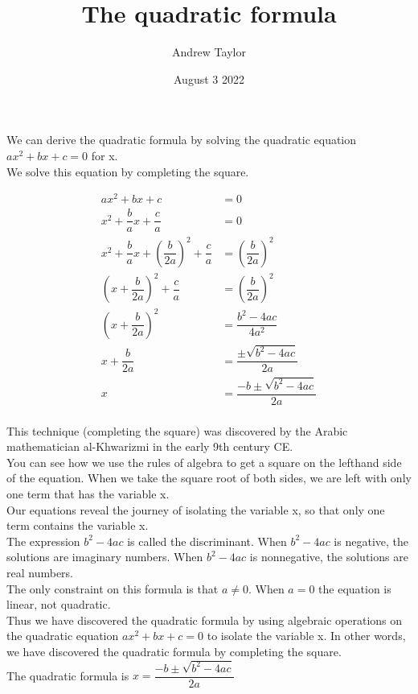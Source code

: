 \documentclass{article}
\title{The quadratic formula}
\author{Andrew Taylor}
\date{August 3 2022}
\begin{document}
\maketitle

We can derive the quadratic formula by solving the quadratic equation $ax^2 + bx + c = 0$ for x. \\

We solve this equation by completing the square.

\begin{align*}
ax^2 + bx + c &= 0 \\
x^2 + \dfrac{b}{a}x + \dfrac{c}{a} &= 0 \\
x^2 + \dfrac{b}{a}x + \left(\dfrac{b}{2a}\right)^2 + \dfrac{c}{a} &= \left(\dfrac{b}{2a}\right)^2 \\
\left(x + \dfrac{b}{2a}\right)^2 + \dfrac{c}{a} &= \left(\dfrac{b}{2a}\right)^2 \\
\left(x + \dfrac{b}{2a}\right)^2 &= \dfrac{b^2 - 4ac}{4a^2} \\
x + \dfrac{b}{2a} &= \dfrac{\pm \sqrt{b^2 - 4ac}}{2a} \\
x &= \dfrac{-b \pm \sqrt{b^2 - 4ac}}{2a} \\
\end{align*}

This technique (completing the square) was discovered by the Arabic mathematician al-Khwarizmi in the early 9th century CE. \\

You can see how we use the rules of algebra to get a square on the lefthand side of the equation. When we take the square root of both sides, we are left with only one term that has the variable x. \\

Our equations reveal the journey of isolating the variable x, so that only one term contains the variable x. \\

The expression $b^2 - 4ac$ is called the discriminant. When $b^2 - 4ac$ is negative, the solutions are imaginary numbers. When $b^2 - 4ac$ is nonnegative, the solutions are real numbers. \\

The only constraint on this formula is that $a \neq 0$. When $a = 0$ the equation is linear, not quadratic. \\

Thus we have discovered the quadratic formula by using algebraic operations on the quadratic equation $ax^2 + bx + c = 0$ to isolate the variable x. In other words, we have discovered the quadratic formula by completing the square. \\

The quadratic formula is $x = \dfrac{-b \pm \sqrt{b^2 - 4ac}}{2a}$
\end{document}
